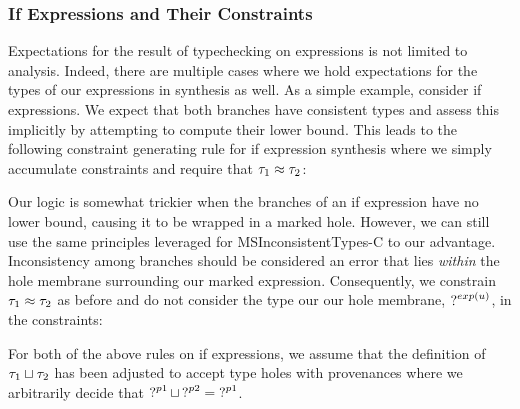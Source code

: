 \subsubsection{If Expressions and Their Constraints}
Expectations for the result of typechecking on expressions is not limited to analysis. Indeed, there are multiple cases where we hold expectations for the types of our expressions in synthesis as well. As a simple example, consider if expressions. We expect that both branches have consistent types and assess this implicitly by attempting to compute their lower bound. This leads to the following constraint generating rule for if expression synthesis where we simply accumulate constraints and require that $\TMV_1 \approx \TMV_2$:

\begin{mathpar}
\end{mathpar} 

Our logic is somewhat trickier when the branches of an if expression have no lower bound, causing it to be wrapped in a marked hole. However, we can still use the same principles leveraged for MSInconsistentTypes-C to our advantage. Inconsistency among branches should be considered an error that lies \emph{within} the hole membrane surrounding our marked expression. Consequently, we constrain $\TMV_1 \approx \TMV_2$ as before and do not consider the type our our hole membrane, $\TUnknown^{exp(u)}$, in the constraints:

\begin{mathpar}
\end{mathpar}

For both of the above rules on if expressions, we assume that the definition of $\TJoin{\TMV_1}{\TMV_2}$ has been adjusted to accept type holes with provenances where we arbitrarily decide that $\TJoin{\TUnknown^{p1}}{\TUnknown^{p2}} = \TUnknown^{p1}$.

